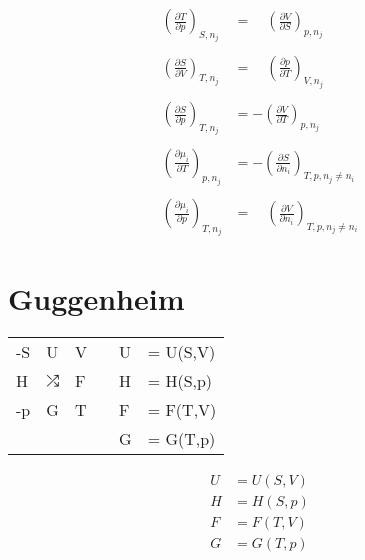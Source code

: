 \documentclass[twocolumn]{article}
\begin{document}
\begin{align*}
	\left(\frac{\partial T}{\partial p}\right)_{S,n_j}
	&= \quad
	\left(\frac{\partial V}{\partial S}\right)_{p,n_j}
	\\\\
	\left(\frac{\partial S}{\partial V}\right)_{T,n_j}
	&= \quad
	\left(\frac{\partial p}{\partial T}\right)_{V,n_j}
	\\\\
	\left(\frac{\partial S}{\partial p}\right)_{T,n_j}
	&= -
	\left(\frac{\partial V}{\partial T}\right)_{p,n_j}
	\\\\
	\left(\frac{\partial \mu _i}{\partial T}\right)_{p,n_j}
	&= -
	\left(\frac{\partial S}{\partial n_i}\right)_{T,p,n_j \neq n_i}
	\\\\
	\left(\frac{\partial \mu_i}{\partial p}\right)_{T,n_j}
	&=
	\quad \left(\frac{\partial V}{\partial n_i}\right)_{T,p,n_j \neq n_i}
\end{align*}
\section{Guggenheim}
\Large
\begin{tabular}{llllll}
	-S  & U  & V&			&U &= U(S,V) \\ 
	H & $\neovsearrow$   &  F&       &H &= H(S,p) \\
	-p & G & T                &      &F &= F(T,V) \\
	 &  &                      &     &G &= G(T,p) \\
\end{tabular}
\normalsize
\break
\begin{align*}
	U &= U(S,V) \\
	H &= H(S,p) \\
	F &= F(T,V) \\
	G &= G(T,p) \\
\end{align*}
\end{document}
